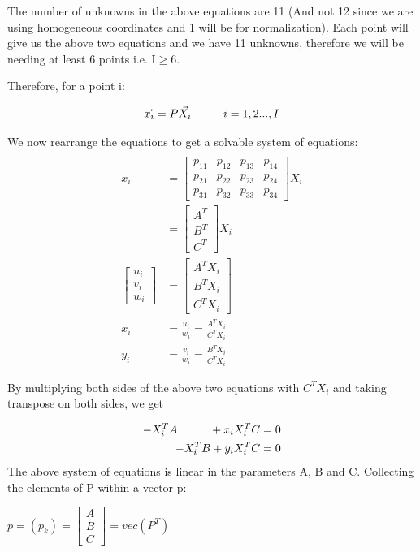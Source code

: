 \documentclass[a4paper]{article}
\begin{document}
The number of unknowns in the above equations are 11 (And not 12 since we are using homogeneous coordinates and 1 will be for normalization). Each point will give us the above two equations and we have 11 unknowns, therefore we will be needing at least 6 points i.e. I$\geq$6. 

Therefore, for a point i:

\begin{equation}
\vec{x_{i}}= P \vec{X_{i}} \hspace{10mm} i = 1,2...,I
\label{eq3}
\end{equation}

We now rearrange the equations to get a solvable system of equations:
\begin{align*}
\\ x_{i}  &=   \begin{bmatrix}p_{11} & p_{12} & p_{13} & p_{14}\\ p_{21} & p_{22} & p_{23} & p_{24}\\ p_{31} & p_{32} & p_{33} & p_{34}\end{bmatrix} X_{i}
\\   &= \begin{bmatrix}A^T\\ B^T\\ C^T\end{bmatrix} X_{i}
\\ \begin{bmatrix} u_{i}\\ v_{i}\\ w_{i} \end{bmatrix}  &=  \begin{bmatrix} A^T X_{i}\\ B^T X_{i}\\ C^T X_{i} \end{bmatrix} 
\\{x_{i}} &= \frac{u_{i}}{w_{i}} = \frac{A^T X_{i}}{C^T X_{i}}
\\{y_{i}} &= \frac{v_{i}}{w_{i}} = \frac{B^T X_{i}}{C^T X_{i}}
\end{align*}

By multiplying both sides of the above two equations with ${C^T X_{i}}$ and taking transpose on both sides, we get 

\begin{align*} \label{eqn4}
-X^T_{i} A \hspace{10mm} + x_{i} X^T_{i} C = 0 \\
\hspace{10mm} -X^T_{i} B + y_{i} X^T_{i} C = 0
\end{align*}
The above system of equations is linear in the parameters A, B and C. Collecting the elements of P within a vector p:
\begin{center}
$ p = (p_{k}) =  \begin{bmatrix}A\\ B\\ C\end{bmatrix} = vec(P^T) $
\end{center}
\end{document}
